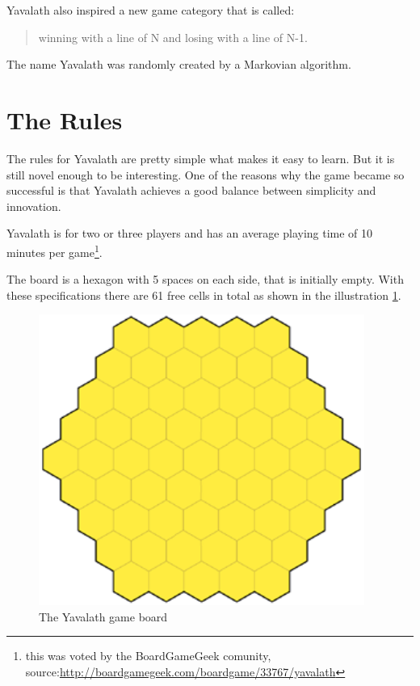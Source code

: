 \documentclass[english]{report} \usepackage[english]{babel}
\begin{document}
Yavalath also inspired a new game category that is called:
\begin{quote}
	winning with a line of N and losing with a line of N-1.
\end{quote}

The name Yavalath was randomly created by a Markovian algorithm.

\section{The Rules}
The rules for Yavalath are pretty simple what makes it easy to learn. But it is
still novel enough to be interesting. 
One of the reasons why the game became so successful is that Yavalath achieves
a good balance between simplicity and innovation.

Yavalath is for two or three players and has an average playing time of 10
minutes per game\footnote{this was voted by the BoardGameGeek comunity,
source:\url{http://boardgamegeek.com/boardgame/33767/yavalath}}.

The board is a hexagon with 5 spaces on each side, that is initially empty.
With these specifications there are 61 free cells in total as shown in the illustration \ref{fig:yav_board}.

\begin{figure}[H]
\centering
\includegraphics[width=0.95\textwidth]{Abbildungen/yav_emptyBoard.png}
\caption[The Yavalath game board, Source:\cite{yvalath}]{The Yavalath game board}
\label{fig:yav_board}
\end{figure}
\end{document}
